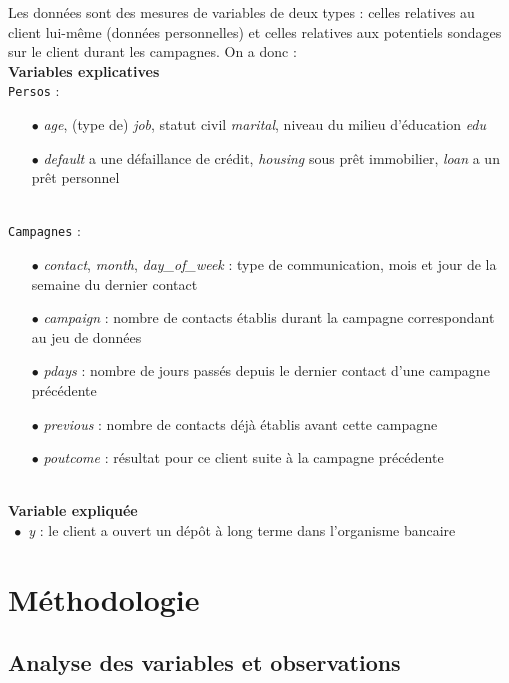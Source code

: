 \documentclass[]{article}
\begin{document}
\par Les données sont des mesures de variables de deux types : celles relatives au client lui-même (données personnelles) et celles relatives aux potentiels sondages sur le client durant les campagnes. On a donc :\newline
~\\
\vspace{0.2cm}
\textbf{Variables explicatives}\\
\vspace{0.1cm}
\indent \texttt{Persos} :
\begin{itemize}
\item[$\bullet$] \textit{age}, (type de) \textit{job}, statut civil \textit{marital}, niveau du milieu d'éducation \textit{edu}
\item[$\bullet$] \textit{default} a une défaillance de crédit, \textit{housing} sous prêt immobilier, \textit{loan} a un prêt personnel
\end{itemize}
~\\
\indent \texttt{Campagnes} :
\begin{itemize}
\item[$\bullet$] \textit{contact}, \textit{month}, \textit{day\_of\_week} : type de communication, mois et jour de la semaine du dernier contact
\item[$\bullet$] \textit{campaign} : nombre de contacts établis durant la campagne correspondant au jeu de données
\item[$\bullet$] \textit{pdays} : nombre de jours passés depuis le dernier contact d'une campagne précédente
\item[$\bullet$] \textit{previous} : nombre de contacts déjà établis avant cette campagne
\item[$\bullet$] \textit{poutcome} : résultat pour ce client suite à la campagne précédente
\end{itemize}


~\\
\textbf{Variable expliquée}\\
\indent $\; \bullet$ \textit{y} : le client a ouvert un dépôt à long terme dans l'organisme bancaire

\section{Méthodologie}

\subsection{Analyse des variables et observations}
\end{document}
